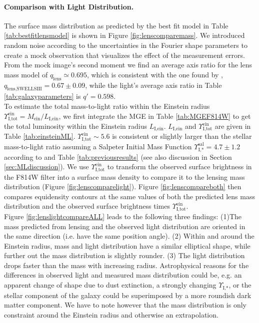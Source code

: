 \paragraph{Comparison with Light Distribution.} The surface mass distribution as predicted by the best fit model in Table \ref{tab:bestfitlensmodel} is shown in Figure \ref{fig:lenscomparemass}. We introduced random noise according to the uncertainties in the Fourier shape parameters to create a mock observation that visualizes the effect of the measurement errors. From the mock image's second moment we find an average axis ratio for the lens mass model of $q_\text{lens} \simeq 0.695$, which is consistent with the one found by \citet{SWELLSIII}, $q_\text{lens,SWELLSIII} = 0.67 \pm 0.09$, while the light's average axis ratio in Table \ref{tab:galaxyparameters} is $q' = 0.598$.
\\To estimate the total mass-to-light ratio within the Einstein radius $\Upsilon_\text{I,tot}^\text{ein} = M_\text{ein} / L_\text{I,ein}$, we first integrate the MGE in Table \ref{tab:MGEF814W} to get the total luminosity within the Einstein radius $L_\text{I,ein}$. $L_\text{I,ein}$ and $\Upsilon_\text{I,tot}^\text{ein}$ are given in Table \ref{tab:einsteinML}. $\Upsilon_\text{I,tot}^\text{ein} \sim 5.6$ is consistent or slightly larger than the stellar mass-to-light ratio assuming a Salpeter Initial Mass Function $\Upsilon_\text{I,*}^\text{sal} = 4.7 \pm 1.2$ according to \citet{SWELLSI} and Table \ref{tab:previousresults} (see also discussion in Section \ref{sec:MLdiscussion}). We use $\Upsilon_\text{I,tot}^\text{ein}$ to transform the observed surface brightness in the F814W filter into a surface mass density to compare it to the lensing mass distribution (Figure \ref{fig:lenscomparelight}). Figure \ref{fig:lenscompareboth} then compares equidensity contours at the same values of both the predicted lens mass distribution and the observed surface brightness times $\Upsilon_\text{I,tot}^\text{ein}$.
\\Figure \ref{fig:lenslightcompareALL} leads to the following three findings: (1)The mass predicted from lensing and the observed light distribution are oriented in the same direction (i.e. have the same position angle). (2) Within and around the Einstein radius, mass and light distribution have a similar elliptical shape, while further out the mass distribution is slightly rounder. (3) The light distribution drops faster than the mass with increasing radius. Astrophysical reasons for the differences in observed light and measured mass distribution could be, e.g. an apparent change of shape due to dust extinction, a strongly changing $\Upsilon_\text{I,*}$, or the stellar component of the galaxy could be superimposed by a more roundish dark matter component.  We have to note however that the mass distribution is only constraint around the Einstein radius and otherwise an extrapolation. 

